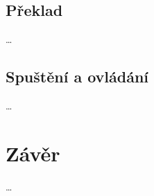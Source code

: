 \documentclass[12pt,a4paper,titlepage,final]{report}
\begin{document}
\subsection{Překlad}

\dots

\subsection{Spuštění a ovládání}

\dots

\section{Závěr}

\dots



\nocite{cite1}
\nocite{cite2}
\nocite{cite3}
\nocite{cite4}


\hypertarget{bib}{}

\end{document}
